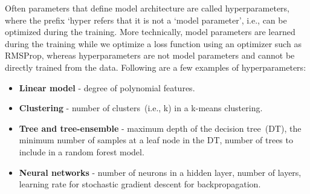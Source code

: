 \hspace*{3.5mm} Often parameters that define model architecture are called hyperparameters, where the prefix `hyper refers that it is not a `model parameter', i.e., can be optimized during the training. More technically, model parameters are learned during the training while we optimize a loss function using an optimizer such as RMSProp, whereas hyperparameters are not model parameters and cannot be directly trained from the data. Following are a few examples of hyperparameters: 

\vspace{-1mm}
\begin{itemize}[noitemsep]
    \item \textbf{Linear model} - degree of polynomial features.
    \item \textbf{Clustering} - number of clusters~(i.e., k) in a k-means clustering.
    \item \textbf{Tree and tree-ensemble} - maximum depth of the decision tree~(DT), the minimum number of samples at a leaf node in the DT, number of trees to include in a random forest model. 
    \item \textbf{Neural networks} - number of neurons in a hidden layer, number of layers, learning rate for stochastic gradient descent for backpropagation. 
\end{itemize} 
\vspace{-2mm}

